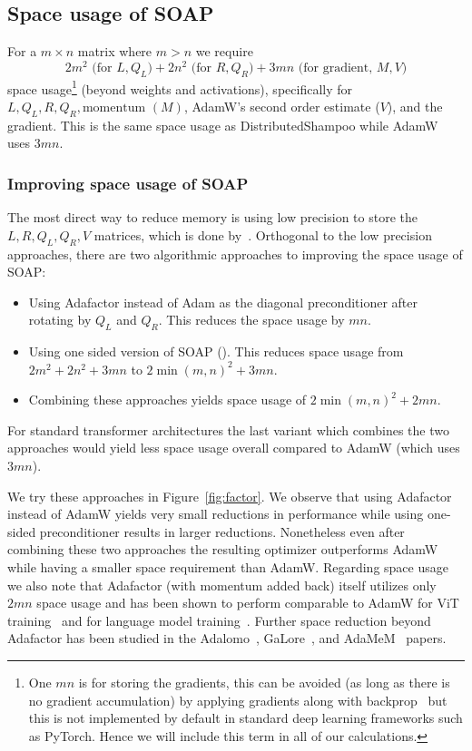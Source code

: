 \documentclass{article} %
\begin{document}
\subsection{Space usage of SOAP}
\label{app:adafactor}




For a $m \times n$ matrix where $m > n$ we require $$2m^2\text{ (for $L, Q_L$)}+2n^2\text{ (for $R, Q_R$)}+3mn\text{ (for gradient, $M, V$)}$$ space usage\footnote{One $mn$ is for storing the gradients, this can be avoided (as long as there is no gradient accumulation) by applying gradients along with backprop~\citep{lomo} but this is not implemented by default in standard deep learning frameworks such as PyTorch. Hence we will include this term in all of our calculations.} (beyond weights and activations), specifically for $L, Q_L, R, Q_R, \text{momentum }(M)$, AdamW's second order estimate ($V$), and the gradient. This is the same space usage as DistributedShampoo while AdamW uses $3mn$.

\subsubsection{Improving space usage of SOAP}
\label{app:impr-space}


The most direct way to reduce memory is using low precision to store the $L, R, Q_L, Q_R, V$ matrices, which is done by~\citet{8bitadam,4bitshampoo}. Orthogonal to the low precision approaches, there are two algorithmic approaches to improving the space usage of SOAP: 
\begin{itemize}
    \item Using Adafactor instead of Adam as the diagonal preconditioner after rotating by $Q_L$ and $Q_R$. This reduces the space usage by $mn$.
    \item Using one sided version of SOAP (). This reduces space usage from $2m^2+2n^2+3mn$ to $2 \min(m,n)^2 + 3mn$.
    \item Combining these approaches yields space usage of $2 \min(m,n)^2 + 2mn$.
\end{itemize} 
For standard transformer architectures the last variant which combines the two approaches would yield less space usage overall compared to AdamW (which uses $3mn$).

We try these approaches in Figure~\ref{fig:factor}. We observe that using Adafactor instead of AdamW yields very small reductions in performance while using one-sided preconditioner results in larger reductions. Nonetheless even after combining these two approaches the resulting optimizer outperforms AdamW while having a smaller space requirement than AdamW. Regarding space usage we also note that Adafactor (with momentum added back) itself utilizes only $2mn$ space usage and has been shown to perform comparable to AdamW for ViT training~\citep{zhai} and for language model training~\citep{zhaoscience}. Further space reduction beyond Adafactor has been studied in the Adalomo~\citep{adalomo}, GaLore~\citep{galore}, and AdaMeM~\citep{adamem} papers.
\end{document}
